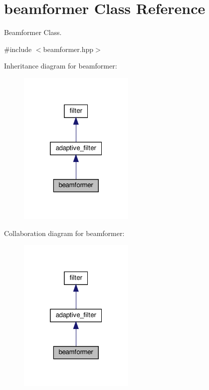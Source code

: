 \hypertarget{classbeamformer}{}\section{beamformer Class Reference}
\label{classbeamformer}


Beamformer Class.  




{\ttfamily \#include $<$beamformer.\+hpp$>$}



Inheritance diagram for beamformer\+:\nopagebreak
\begin{figure}[H]
\begin{center}
\leavevmode
\includegraphics[width=157pt]{classbeamformer__inherit__graph}
\end{center}
\end{figure}


Collaboration diagram for beamformer\+:\nopagebreak
\begin{figure}[H]
\begin{center}
\leavevmode
\includegraphics[width=157pt]{classbeamformer__coll__graph}
\end{center}
\end{figure}
